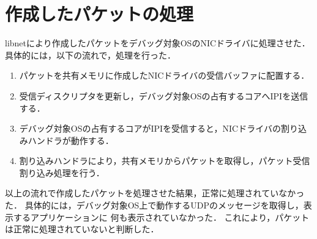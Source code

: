 \documentclass[12pt]{jsarticle}
\begin{document}
\section{作成したパケットの処理}
libnetにより作成したパケットをデバッグ対象OSのNICドライバに処理させた．
具体的には，以下の流れで，処理を行った．
\begin{enumerate}
    \item パケットを共有メモリに作成したNICドライバの受信バッファに配置する．
    \item 受信ディスクリプタを更新し，デバッグ対象OSの占有するコアへIPIを送信する．
    \item デバッグ対象OSの占有するコアがIPIを受信すると，NICドライバの割り込みハンドラが動作する．
    \item 割り込みハンドラにより，共有メモリからパケットを取得し，パケット受信割り込み処理を行う．
\end{enumerate}
以上の流れで作成したパケットを処理させた結果，正常に処理されていなかった．
具体的には，デバッグ対象OS上で動作するUDPのメッセージを取得し，表示するアプリケーションに
何も表示されていなかった．
これにより，パケットは正常に処理されていないと判断した．

\end{document}
